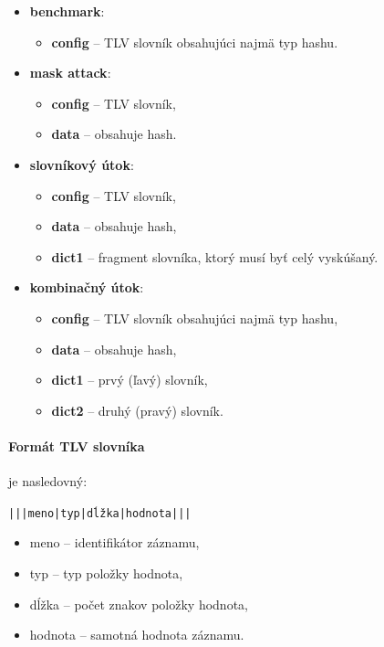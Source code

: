 \begin{itemize}
	\item \textbf{benchmark}:
		\begin{itemize}
			\item \textbf{config} -- TLV slovník obsahujúci najmä typ hashu.
		\end{itemize}

	\item \textbf{mask attack}:
		\begin{itemize}
			\item \textbf{config} -- TLV slovník,
			\item \textbf{data} -- obsahuje hash.
		\end{itemize}

	\item \textbf{slovníkový útok}:
		\begin{itemize}
			\item \textbf{config} -- TLV slovník,
			\item \textbf{data} -- obsahuje hash,
			\item \textbf{dict1} -- fragment slovníka, ktorý musí byť celý vyskúšaný.
		\end{itemize}

	\item \textbf{kombinačný útok}:
		\begin{itemize}
			\item \textbf{config} -- TLV slovník obsahujúci najmä typ hashu,
			\item \textbf{data} -- obsahuje hash,
			\item \textbf{dict1} -- prvý (ľavý) slovník,
			\item \textbf{dict2} -- druhý (pravý) slovník.
		\end{itemize}
\end{itemize}

\paragraph{Formát TLV slovníka} je nasledovný:
\begin{flushleft}
	\texttt{|||meno|typ|dĺžka|hodnota|||}
\end{flushleft}
\begin{itemize}
	\item meno -- identifikátor záznamu,
	\item typ -- typ položky hodnota,
	\item dĺžka -- počet znakov položky hodnota,
	\item hodnota -- samotná hodnota záznamu.
\end{itemize}

